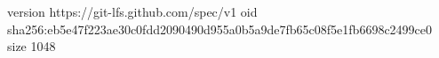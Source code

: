 version https://git-lfs.github.com/spec/v1
oid sha256:eb5e47f223ae30c0fdd2090490d955a0b5a9de7fb65c08f5e1fb6698c2499ce0
size 1048
